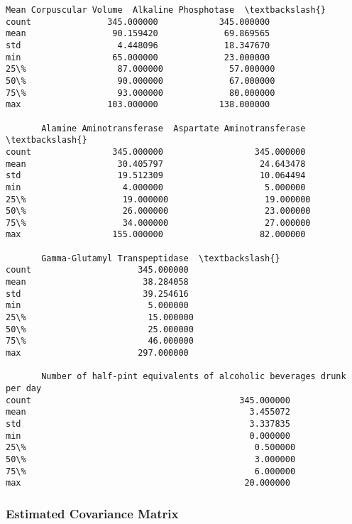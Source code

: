 \documentclass[11pt]{article}
\makeatletter
\newcommand{\boxspacing}{\kern\kvtcb@left@rule\kern\kvtcb@boxsep}
\newcommand{\prompt}[4]{
        {\ttfamily\llap{{\color{#2}[#3]:\hspace{3pt}#4}}\vspace{-\baselineskip}}
    }
\makeatother
\begin{document}
            \begin{tcolorbox}[breakable, size=fbox, boxrule=.5pt, pad at break*=1mm, opacityfill=0]
\prompt{Out}{outcolor}{13}{\boxspacing}
\begin{Verbatim}[commandchars=\\\{\}]
       Mean Corpuscular Volume  Alkaline Phosphotase  \textbackslash{}
count               345.000000            345.000000
mean                 90.159420             69.869565
std                   4.448096             18.347670
min                  65.000000             23.000000
25\%                  87.000000             57.000000
50\%                  90.000000             67.000000
75\%                  93.000000             80.000000
max                 103.000000            138.000000

       Alamine Aminotransferase  Aspartate Aminotransferase  \textbackslash{}
count                345.000000                  345.000000
mean                  30.405797                   24.643478
std                   19.512309                   10.064494
min                    4.000000                    5.000000
25\%                   19.000000                   19.000000
50\%                   26.000000                   23.000000
75\%                   34.000000                   27.000000
max                  155.000000                   82.000000

       Gamma-Glutamyl Transpeptidase  \textbackslash{}
count                     345.000000
mean                       38.284058
std                        39.254616
min                         5.000000
25\%                        15.000000
50\%                        25.000000
75\%                        46.000000
max                       297.000000

       Number of half-pint equivalents of alcoholic beverages drunk per day
count                                         345.000000
mean                                            3.455072
std                                             3.337835
min                                             0.000000
25\%                                             0.500000
50\%                                             3.000000
75\%                                             6.000000
max                                            20.000000
\end{Verbatim}
\end{tcolorbox}
        
    \hypertarget{estimated-covariance-matrix}{%
\subsubsection{Estimated Covariance
Matrix}\label{estimated-covariance-matrix}}
\end{document}
